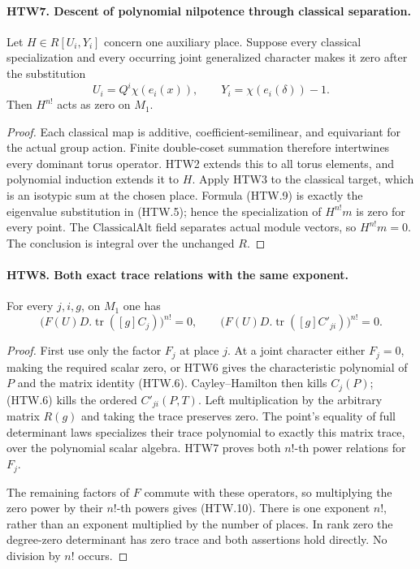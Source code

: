 \documentclass[11pt,a4paper]{article}
\numberwithin{equation}{section}
\theoremstyle{remark}\newtheorem{remark}[theorem]{Remark}
\begin{document}

\paragraph{HTW7. Descent of polynomial nilpotence through classical separation.}
\label{claim:HTW7}
Let \(H\in R[U_i,Y_i]\) concern one auxiliary place.
Suppose every classical specialization and every occurring
joint generalized character makes it zero after the
substitution
\[
 U_i=Q^i\chi(e_i(x)),\qquad
 Y_i=\chi(e_i(\delta))-1 .
 \tag{HTW.9}
\]
Then \(H^{n!}\) acts as zero on \(M_1\).
\begin{proof}
Each classical map is additive, coefficient-semilinear,
and equivariant for the actual group action.  Finite
double-coset summation therefore intertwines every
dominant torus operator.  HTW2 extends this to all torus
elements, and polynomial induction extends it to \(H\).
Apply HTW3 to the classical target, which is an isotypic
sum at the chosen place.  Formula (HTW.9) is exactly
the eigenvalue substitution in (HTW.5); hence the
specialization of \(H^{n!}m\) is zero for every point.
The \(\mathrm{ClassicalAlt}\) field separates actual
module vectors, so \(H^{n!}m=0\).  The conclusion is
integral over the unchanged \(R\).
\end{proof}

\paragraph{HTW8. Both exact trace relations with the same exponent.}
\label{claim:HTW8}
For every \(j,i,g\), on \(M_1\) one has
\[
 \big(F(U)D.\operatorname{tr}([g]C_j)\big)^{n!}=0,\qquad
 \big(F(U)D.\operatorname{tr}([g]C'_{ji})\big)^{n!}=0 .
 \tag{HTW.10}
\]
\begin{proof}
First use only the factor \(F_j\) at place \(j\).
At a joint character either \(F_j=0\), making the
required scalar zero, or HTW6 gives the characteristic
polynomial of \(P\) and the matrix identity (HTW.6).
Cayley--Hamilton then kills \(C_j(P)\); (HTW.6) kills
the ordered \(C'_{ji}(P,T)\).  Left multiplication
by the arbitrary matrix \(R(g)\) and taking the trace
preserves zero.  The point's equality of full determinant
laws specializes their trace polynomial to exactly this
matrix trace, over the polynomial scalar algebra.
HTW7 proves both \(n!\)-th power relations for \(F_j\).

The remaining factors of \(F\) commute with these
operators, so multiplying the zero power by their
\(n!\)-th powers gives (HTW.10).  There is one
exponent \(n!\), rather than an exponent multiplied by
the number of places.  In rank zero the degree-zero
determinant has zero trace and both assertions hold
directly.  No division by \(n!\) occurs.
\end{proof}
\end{document}
